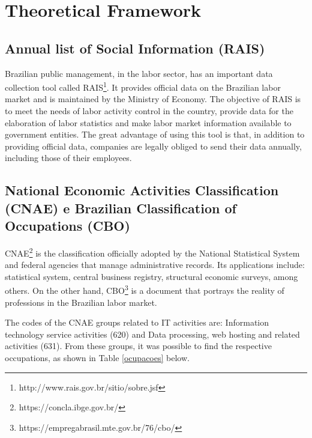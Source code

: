 \section{Theoretical Framework}
\subsection{Annual list of Social Information (RAIS)}

Brazilian public management, in the labor sector, has an important data collection tool called RAIS\footnote{http://www.rais.gov.br/sitio/sobre.jsf}. It provides official data on the Brazilian labor market and is maintained by the Ministry of Economy. The objective of RAIS is to meet the needs of labor activity control in the country, provide data for the elaboration of labor statistics and make labor market information available to government entities. The great advantage of using this tool is that, in addition to providing official data, companies are legally obliged to send their data annually, including those of their employees.

\subsection{National Economic Activities Classification (CNAE) e Brazilian Classification of Occupations (CBO)}

CNAE\footnote{https://concla.ibge.gov.br/} is the classification officially adopted by the National Statistical System and federal agencies that manage administrative records. Its applications include: statistical system, central business registry, structural economic surveys, among others. On the other hand, CBO\footnote{https://empregabrasil.mte.gov.br/76/cbo/} is a document that portrays the reality of professions in the Brazilian labor market.

The codes of the CNAE groups related to IT activities are: Information technology service activities (620) and Data processing, web hosting and related activities (631). From these groups, it was possible to find the respective occupations, as shown in Table \ref{ocupacoes} below.

